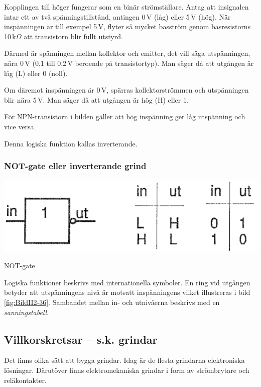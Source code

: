Kopplingen till höger fungerar som en binär strömställare. Antag att
insignalen intar ett av två spänningstillstånd, antingen 0\,V (låg)
eller 5\,V (hög). När inspänningen är till exempel 5\,V, flyter så
mycket basström genom basresistorns 10\,k\(\Omega\) att transistorn
blir fullt utstyrd.

Därmed är spänningen mellan kollektor och emitter, det vill säga
utspänningen, nära 0\,V (0,1 till 0,2\,V beroende på transistortyp).
Man säger då att utgången är låg (L) eller 0 (noll).

Om däremot inspänningen är 0\,V, spärras kollektorströmmen och
utspänningen blir nära 5\,V. Man säger då att utgången är hög (H)
eller 1.

För NPN-transistorn i bilden gäller att hög inspänning ger låg
utspänning och vice versa.

Denna logiska funktion kallas inverterande.

\subsubsection{NOT-gate eller inverterande grind}

\begin{marginfigure}
\includegraphics[width=\textwidth]{images/cropped_pdfs/bild_2_2-36.pdf}
\caption{NOT-gate}
\label{fig:BildII2-36}
\end{marginfigure}

Logiska funktioner beskrivs med internationella symboler. En ring vid
utgången betyder att utspänningens nivå är motsatt inspänningens
vilket illustreras i bild \ref{fig:BildII2-36}. Sambandet mellan in-
och utnivåerna beskrivs med en \emph{sanningstabell}.

\subsection{Villkorskretsar -- s.k. grindar}

Det finns olika sätt att bygga grindar. Idag är de flesta grindarna
elektroniska lösningar. Därutöver finns elektromekaniska grindar i
form av strömbrytare och reläkontakter.

